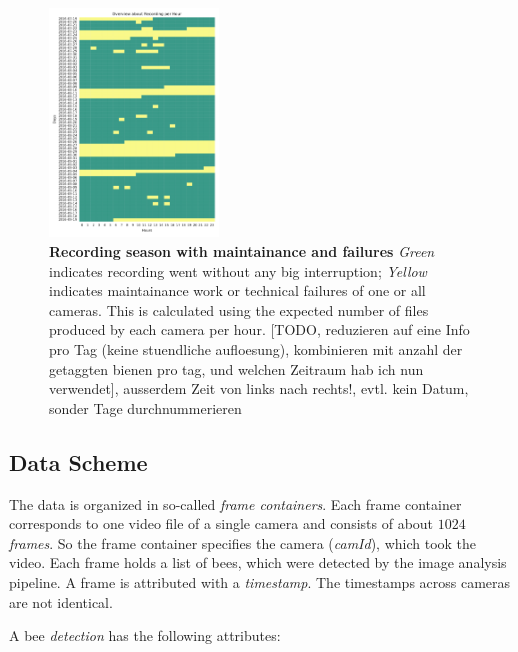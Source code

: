\begin{figure}[htb]
	\centering
	\includegraphics[width=0.4\textwidth]{Figures/recording}
	\caption[Recording season with maintainance and failures]{\textbf{Recording season with maintainance and failures} \emph{Green} indicates recording went without any big interruption; \emph{Yellow} indicates maintainance work or technical failures of one or all cameras. This is calculated using the expected number of files produced by each camera per hour. [TODO, reduzieren auf eine Info pro Tag (keine stuendliche aufloesung), kombinieren mit anzahl der getaggten bienen pro tag, und welchen Zeitraum hab ich nun verwendet], ausserdem Zeit von links nach rechts!, evtl. kein Datum, sonder Tage durchnummerieren}
	\label{fig:period}
\end{figure}

\clearpage
\subsection{Data Scheme}
\label{subsec:datascheme}
The data is organized in so-called \emph{frame containers}.
Each frame container corresponds to one video file of a single camera and consists of about $1024$ \emph{frames}. So the frame container specifies the camera (\emph{camId}), which took the video.
Each frame holds a list of bees, which were detected by the image analysis pipeline. A frame is attributed with a \emph{timestamp}. The timestamps across cameras are not identical.

A bee \emph{detection} has the following attributes:

